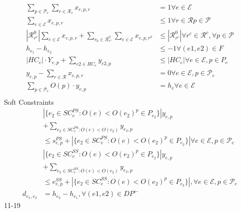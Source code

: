 \documentclass{article}
\newcommand{\scriptP}{\mathcal{P}}
\newcommand{\scriptR}{\mathcal{R}}
\newcommand{\scriptE}{\mathcal{E}}
\begin{document}
\begin{align}
    \sum_{p\in\scriptP_e}\sum_{r\in\scriptR_e} x_{e,p,r} &= 1 \forall e \in \scriptE \\
    \sum_{e\in \scriptE} x_{e,p,r} &\le 1 \forall r \in \scriptR p \in \scriptP \\
    |\scriptR^0_{r^c}| \sum_{e\in\scriptE} x_{e,p,r} + \sum_{r_0\in\scriptR^0_{r^c}}\sum_{e\in \scriptE}x_{e,p,r^0} &\le |\scriptR^0_{r^c}| \forall r^c \in \scriptR^c, \forall p \in \scriptP \\
    h_{e_1} - h_{e_2} &\le -1 \forall(e1, e2) \in F \\
    |HC_{e}| \cdot Y_{e,p} + \sum_{e2 \in HC_e}y_{e2, p} &\le |HC_{e}| \forall e\in \scriptE, p \in P_{e} \\
    y_{e,p} - \sum_{r\in\scriptR} x_{e,p,r} &= 0 \forall e \in \scriptE, p \in \scriptP_e \\
    \sum_{p\in \scriptP_e}O(p) \cdot y_{e,p} &= h_{e} \forall e \in \scriptE \\
\end{align}
Soft Constraints
\begin{align}
    &|\{e_2 \in SC_e^{PS}: O(e) < O(e_2) ^ p \in P_{e_2}\}| y_{e,p} \nonumber \\
    &+ \sum_{e_2 \in SC^{PS}_e : O(e) < O(e_2)} y_{e_2, p} \nonumber\\
    &\le s^{PS}_{e,p} + |\{e_2 \in SC_e^{PS}: O(e) < O(e_2) ^ p \in P_{e_2}\}| \forall e \in \scriptE, p \in \scriptP_e \\
    &|\{e_2 \in SC_e^{SS}: O(e) < O(e_2) ^ p \in P_{e_2}\}| y_{e,p} \nonumber\\ 
    &+ \sum_{e_2\in SC_e^{SS}:O(e)<O(e_2)} y_{e_2, p} \nonumber\\
    &\le e^{SS}_{e,p} + |\{e_2 \in SC_e^{SS}: O(e) < O(e_2) ^ p \in P_{e_2}\}|, \forall e \in \scriptE, p \in \scriptP_e \\
    d_{e_1, e_2} &= h_{e_2} - h_{e_1}, \forall (e1, e2) \in DP^{\leftarrow}
\end{align}
11-19
\end{document}

